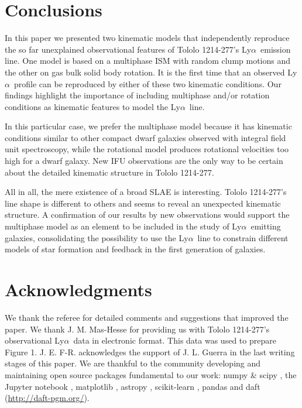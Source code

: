 \documentclass[a4paper,fleqn,usenatbib]{mnras}
\newcommand{\tol}{Tololo 1214-277}
\newcommand{\lya}{\ifmmode{{\rm Ly}\alpha}\else Ly$\alpha$\ \fi}
\begin{document}
\section{Conclusions}
\label{sec:conclusions}

In this paper we presented two kinematic models that independently
reproduce the so far unexplained observational features of \tol's
\lya emission line.
One model is based on a multiphase ISM with random clump motions and
the other on gas bulk solid body rotation. 
It is the first time that an observed \lya profile can be 
reproduced by either of these two kinematic conditions.
Our findings highlight the importance of including multiphase and/or
rotation conditions as kinematic features to model the \lya line.

In this particular case, we prefer the multiphase model because it has kinematic
conditions similar to other compact dwarf galaxies observed
with integral field unit spectroscopy, while the
rotational model produces rotational velocities too high for a dwarf
galaxy.  
New IFU observations are the only way to be certain about the detailed
kinematic structure in \tol.  

All in all, the mere existence of a broad SLAE is interesting.  
\tol's line shape is different to others and seems to reveal an
unexpected kinematic structure.
A confirmation of our results by new observations would support the multiphase model
as an element to be included in the study of \lya emitting
galaxies, consolidating the possibility to use the \lya line to
  constrain different models of star formation and feedback in the
  first generation of galaxies. 
 
\section*{Acknowledgments}
We thank the referee for detailed comments and suggestions that
improved the paper. 
We thank J. M. Mas-Hesse for providing us with \tol's observational
\lya data \citep{mashesse03} in electronic format. This data was
used to prepare Figure 1.
J. E. F-R. acknowledges the support of J. L. Guerra in the last
writing stages of this paper.
We are thankful to the community developing and maintaining open source
packages fundamental to our work: numpy \& scipy \citep{numpy}, the
Jupyter notebook \citep{IPython,jupyter}, matplotlib
\citep{matplotlib}, astropy \citep{astropy},  scikit-learn
\citep{scikit-learn}, pandas \citep{pandas} and daft
(\url{http://daft-pgm.org/}).  
\end{document}
